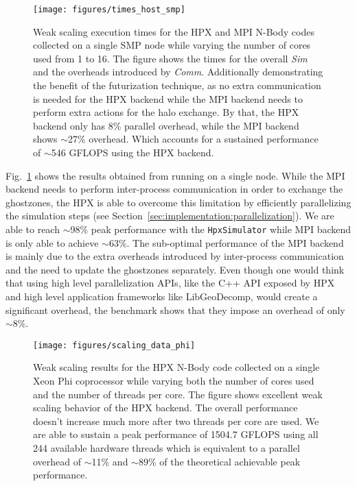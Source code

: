 \documentclass{sig-alternate}
\newcommand{\I}[1]{\textit{#1}}
\newcommand{\ctype}[1]{\texttt{{{#1}}}}
\newcommand{\upp}{\vspace*{-0.5em}}
\newcommand{\up}{\vspace*{-0.25em}}
\begin{document}
\begin{figure}[ht]
  \texttt{[image: figures/times\_host\_smp]}
    \upp
  \caption{Weak scaling execution times for the HPX and MPI N-Body codes collected on a
    single SMP node while varying the number of cores used from 1 to 16. The figure shows
    the times for the overall \I{Sim} and the overheads introduced by \I{Comm}.
    Additionally demonstrating the benefit of the futurization technique, as no extra
    communication is needed for the HPX backend while the MPI backend needs to
    perform extra actions for the halo exchange. By that, the HPX backend only
    has 8\% parallel overhead, while the MPI backend shows $\sim$27\% overhead. Which
    accounts for a sustained performance of $\sim$546 GFLOPS using the HPX backend.}
\label{fig:times_host_smp}
     \upp
     \upp
     \upp
\end{figure}

Fig.~\ref{fig:times_host_smp} shows the results obtained from running on a single
node. While the MPI backend needs to perform inter-process communication in order
to exchange the ghostzones, the HPX is able to overcome this limitation by
efficiently parallelizing the simulation steps (see Section~\ref{sec:implementation:parallelization}).
We are able to reach $\sim$98\% peak performance with the \ctype{HpxSimulator} while
MPI backend is only able to achieve $\sim$63\%. The sub-optimal performance of the MPI
backend is mainly due to the extra overheads introduced by inter-process communication
and the need to update the ghostzones separately. Even though one would think
that using high level parallelization APIs, like the C++ API exposed by HPX and
high level application frameworks like LibGeoDecomp, would create a significant overhead,
the benchmark shows that they impose an overhead of only $\sim$8\%.

\begin{figure}[ht]
  \texttt{[image: figures/scaling\_data\_phi]}
    \upp\upp
  \caption{Weak scaling results for the HPX N-Body code collected on a
      single Xeon Phi coprocessor while varying both the number of cores used and
      the number of threads per core. The figure shows excellent weak scaling
      behavior of the HPX backend. The overall performance doesn't increase
      much more after two threads per core are used. We are able to sustain a peak
      performance of 1504.7 GFLOPS using all 244 available hardware threads which
      is equivalent to a parallel overhead of $\sim$11\% and $\sim$89\% of the
      theoretical achievable peak performance.}
\label{fig:scaling_data_phi}
\upp
\end{figure}
\end{document}

